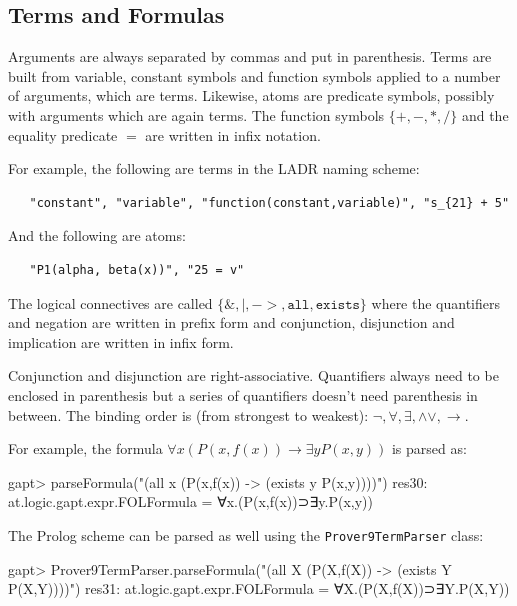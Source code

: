 \documentclass[a4paper,11pt]{article}
\renewcommand{\land}{\wedge}
\renewcommand{\lor}{\vee}
\begin{document}
\begin{appendix}
\subsection{Terms and Formulas}
Arguments are always separated by commas and put in parenthesis. Terms are
 built from variable, constant symbols and function symbols applied
 to a number of arguments, which are terms. Likewise, atoms are
 predicate symbols, possibly with arguments which are again terms. The
 function symbols $\{\mathtt{+,-,*,/}\}$ and the equality predicate $=$
 are written in infix notation.

For example, the following are terms in the LADR naming scheme:

 \begin{lstlisting}
   "constant", "variable", "function(constant,variable)", "s_{21} + 5"
 \end{lstlisting}

And the following are atoms:

 \begin{lstlisting}
   "P1(alpha, beta(x))", "25 = v"
 \end{lstlisting}

The logical connectives are called $\{\mathtt{\&,|,->,all,exists}\}$ where
 the quantifiers and negation are written in prefix form and conjunction,
 disjunction and implication are written in infix form.

Conjunction and disjunction are right-associative. Quantifiers always need to
 be enclosed in parenthesis but a series of quantifiers doesn't need parenthesis
 in between. The binding order is (from strongest to weakest):
 $\mathtt{\neg,\forall,\exists,\land\lor,\rightarrow}$.


For example, the formula $\forall x (P(x,f(x)) \rightarrow \exists y P(x,y))$
 is parsed as:

\begin{clilisting}
gapt> parseFormula("(all x (P(x,f(x)) -> (exists y P(x,y))))")
res30: at.logic.gapt.expr.FOLFormula = ∀x.(P(x,f(x))⊃∃y.P(x,y))

\end{clilisting}

The Prolog scheme can be parsed as well using the \texttt{Prover9TermParser}
class:

\begin{clilisting}
gapt> Prover9TermParser.parseFormula("(all X (P(X,f(X)) -> (exists Y P(X,Y))))")
res31: at.logic.gapt.expr.FOLFormula = ∀X.(P(X,f(X))⊃∃Y.P(X,Y))


\end{clilisting}
\end{appendix}
\end{document}
